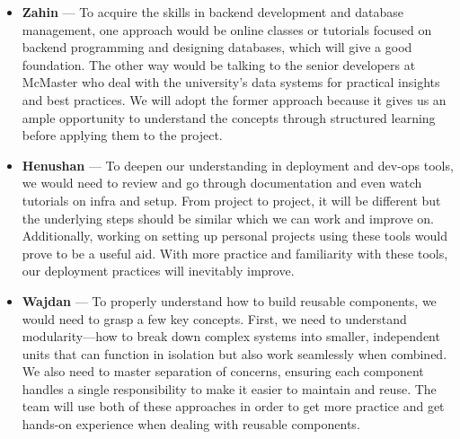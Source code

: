 \documentclass[12pt]{article}
\begin{document}
\begin{portrait}
\begin{itemize}
    \item \textbf{Zahin} — To acquire the skills in backend development and database management, one approach would be online classes or tutorials focused on backend programming and designing databases, which will give a good foundation. The other way would be talking to the senior developers at McMaster who deal with the university's data systems for practical insights and best practices. We will adopt the former approach because it gives us an ample opportunity to understand the concepts through structured learning before applying them to the project.

    \item \textbf{Henushan} — To deepen our understanding in deployment and dev-ops tools, we would need to review and go through documentation and even watch tutorials on infra and setup. From project to project, it will be different but the underlying steps should be similar which we can work and improve on. Additionally, working on setting up personal projects using these tools would prove to be a useful aid. With more practice and familiarity with these tools, our deployment practices will inevitably improve.

    \item \textbf{Wajdan} — To properly understand how to build reusable components, we would need to grasp a few key concepts. First, we need to understand modularity—how to break down complex systems into smaller, independent units that can function in isolation but also work seamlessly when combined. We also need to master separation of concerns, ensuring each component handles a single responsibility to make it easier to maintain and reuse. The team will use both of these approaches in order to get more practice and get hands-on experience when dealing with reusable components.
\end{itemize}


\end{portrait}
\end{document}
